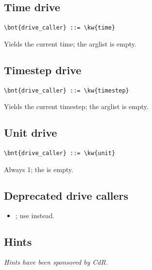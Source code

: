 \subsection{Time drive}
\begin{Verbatim}[commandchars=\\\{\}]
    \bnt{drive_caller} ::= \kw{time}
\end{Verbatim}
Yields the current time; the arglist is empty.

\subsection{Timestep drive}
\begin{Verbatim}[commandchars=\\\{\}]
    \bnt{drive_caller} ::= \kw{timestep}
\end{Verbatim}
Yields the current timestep; the arglist is empty.

\subsection{Unit drive}
\begin{Verbatim}[commandchars=\\\{\}]
    \bnt{drive_caller} ::= \kw{unit}
\end{Verbatim}
Always 1; the  is empty.

\subsection{Deprecated drive callers}
\begin{itemize}
\item {}; use  instead.
\end{itemize}








\subsection{Hints}\label{sec:GENERAL:DRIVE:HINT}
\emph{Hints have been sponsored
by  CdR.}
\bigskip

